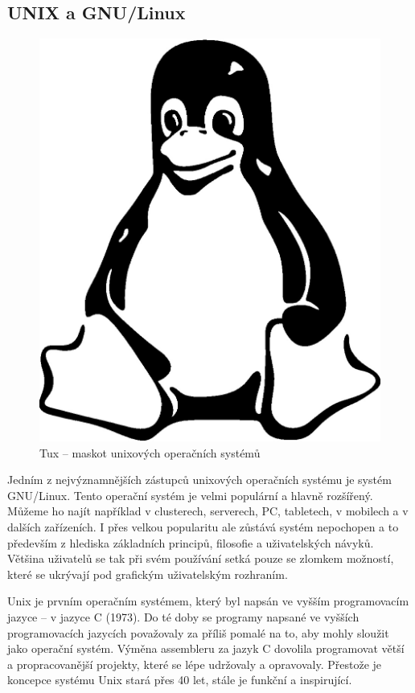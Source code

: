 \documentclass{article}
\begin{document}
\subsection{UNIX a GNU/Linux}
\begin{figure}[H]
\begin{center}
\includegraphics[scale=0.2]{tux.jpg}
\end{center}
\caption{Tux -- maskot unixových operačních systémů}
\end{figure}

Jedním z nejvýznamnějších zástupců unixových operačních systému je systém GNU/Linux. Tento operační systém je velmi populární a hlavně rozšířený. Můžeme ho najít například v clusterech, serverech, PC, tabletech, v mobilech a v dalších zařízeních.  I přes velkou popularitu ale zůstává systém nepochopen a to především z hlediska základních principů, filosofie a uživatelských návyků. Většina  uživatelů se tak při svém používání setká pouze se zlomkem možností, které se ukrývají pod grafickým uživatelským rozhraním. 

Unix je prvním operačním systémem, který byl napsán ve vyšším programovacím jazyce -- v jazyce C (1973). Do té doby se programy napsané ve vyšších programovacích jazycích považovaly za příliš pomalé na to, aby mohly sloužit jako operační systém. Výměna assembleru za jazyk C dovolila programovat větší a propracovanější projekty, které se lépe udržovaly a opravovaly. Přestože je koncepce systému Unix stará přes 40 let, stále je funkční a inspirující.
\end{document}
